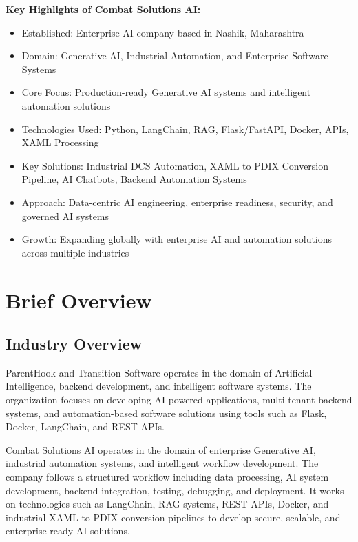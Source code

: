 \documentclass[12pt,a4paper]{report}
\begin{document}
\noindent\textbf{Key Highlights of Combat Solutions AI:}
\begin{itemize}[leftmargin=1.5cm]
    \item Established: Enterprise AI company based in Nashik, Maharashtra
    \item Domain: Generative AI, Industrial Automation, and Enterprise Software Systems
    \item Core Focus: Production-ready Generative AI systems and intelligent automation solutions
    \item Technologies Used: Python, LangChain, RAG, Flask/FastAPI, Docker, APIs, XAML Processing
    \item Key Solutions: Industrial DCS Automation, XAML to PDIX Conversion Pipeline, AI Chatbots, Backend Automation Systems
    \item Approach: Data-centric AI engineering, enterprise readiness, security, and governed AI systems
    \item Growth: Expanding globally with enterprise AI and automation solutions across multiple industries
\end{itemize}

\section{Brief Overview}

\subsection{Industry Overview}

ParentHook and Transition Software operates in the domain of Artificial Intelligence, backend development, and intelligent software systems. The organization focuses on developing AI-powered applications, multi-tenant backend systems, and automation-based software solutions using tools such as Flask, Docker, LangChain, and REST APIs.

Combat Solutions AI operates in the domain of enterprise Generative AI, industrial automation systems, and intelligent workflow development. The company follows a structured workflow including data processing, AI system development, backend integration, testing, debugging, and deployment. It works on technologies such as LangChain, RAG systems, REST APIs, Docker, and industrial XAML-to-PDIX conversion pipelines to develop secure, scalable, and enterprise-ready AI solutions.
\end{document}
